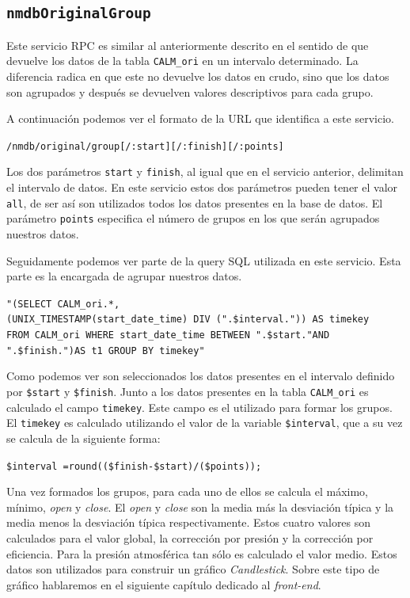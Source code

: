 	\subsection{\texttt{nmdbOriginalGroup}}
		Este servicio RPC es similar al anteriormente descrito en el sentido de que devuelve los datos de la tabla \texttt{CALM\_ori} en un
		intervalo determinado. La diferencia radica en que este no devuelve los datos en crudo, sino que los datos son agrupados y después se
		devuelven valores descriptivos para cada grupo.
		\par
		A continuación podemos ver el formato de la URL que identifica a este servicio.
			\begin{center} \texttt{/nmdb/original/group[/:start][/:finish][/:points]}  \end{center} 
		Los dos parámetros \texttt{start} y \texttt{finish}, al igual que en el servicio anterior, delimitan el intervalo de datos. En este
		servicio estos dos parámetros pueden tener el valor \texttt{all}, de ser así son utilizados todos los datos presentes en la base de
		datos. El parámetro \texttt{points} especifica el número de grupos en los que serán agrupados nuestros datos. 
		\par
		Seguidamente podemos ver parte de la query SQL utilizada en este servicio. Esta parte es la encargada de agrupar nuestros datos.
			\begin{center} \texttt{"(SELECT CALM\_ori.*,
			  		\\	(UNIX\_TIMESTAMP(start\_date\_time) DIV (".\$interval.")) AS timekey  
				      	\\	FROM CALM\_ori WHERE start\_date\_time BETWEEN \cc".\$start."\cc AND \cc".\$finish."\cc)AS t1  GROUP BY timekey"}
			\end{center} 
		Como podemos ver son seleccionados los datos presentes en el intervalo definido por \texttt{\$start} y \texttt{\$finish}. Junto a los
		datos presentes en la tabla \texttt{CALM\_ori} es calculado el campo \texttt{timekey}. Este campo es el utilizado para formar los
		grupos. El \texttt{timekey} es calculado utilizando el valor de la variable \texttt{\$interval}, que a su vez se calcula de la
		siguiente forma:
			\begin{center} \texttt{\$interval =round((\$finish-\$start)/(\$points));}  \end{center} 
		Una vez formados los grupos, para cada uno de ellos se calcula el máximo, mínimo, \emph{open} y \emph{close}. El \emph{open} y
		\emph{close} son la media más la desviación típica y la media menos la desviación típica respectivamente. Estos cuatro valores son
		calculados para el valor global, la corrección por presión y la corrección por eficiencia. Para la presión atmosférica tan sólo es
		calculado el valor medio. Estos datos son utilizados para construir un gráfico \emph{Candlestick}. Sobre este tipo de gráfico
		hablaremos en el siguiente capítulo dedicado al \emph{front-end}.
